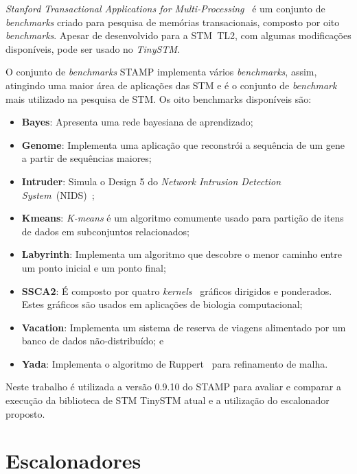 \documentclass[diss,capa]{texufpel}
\begin{document}
\emph{Stanford Transactional Applications for Multi-Processing}~\cite{STAMP} é um conjunto de \emph{benchmarks} criado para pesquisa de memórias transacionais, composto por oito \emph{benchmarks}. Apesar de desenvolvido para a STM~TL2, com algumas modificações disponíveis, pode ser usado no \emph{TinySTM}.


O conjunto de \emph{benchmarks} STAMP implementa vários \emph{benchmarks}, assim, atingindo uma maior área de aplicações das STM e é o conjunto de \emph{benchmark} mais utilizado na pesquisa de STM. Os oito benchmarks disponíveis são:

\begin{itemize}
  \item \textbf{Bayes}: Apresenta uma rede bayesiana de aprendizado;
  \item \textbf{Genome}: Implementa uma aplicação que reconstrói a sequência de um gene a partir de sequências maiores;
  \item \textbf{Intruder}: Simula o Design 5 do \emph{Network Intrusion Detection System}~(NIDS)~\cite{Haagdorens05};
  \item \textbf{Kmeans}:  \emph{K-means} é um algoritmo comumente usado para partição de itens de dados em subconjuntos relacionados;
  \item \textbf{Labyrinth}: Implementa um algoritmo que descobre o menor caminho entre um ponto inicial e um ponto final;
  \item \textbf{SSCA2}: É composto por quatro \emph{kernels}~\cite{Bader05} gráficos dirigidos e ponderados. Estes gráficos são usados em aplicações de biologia computacional;
  \item \textbf{Vacation}: Implementa um sistema de reserva de viagens alimentado por um banco de dados não-distribuído; e
  \item \textbf{Yada}: Implementa o algoritmo de Ruppert~\cite{Ruppert95} para refinamento de malha.
\end{itemize}

Neste trabalho é utilizada a versão 0.9.10 do STAMP para avaliar e comparar a execução da biblioteca de STM TinySTM atual e a utilização do escalonador proposto.

\chapter{Escalonadores}
\label{chapter::escalonadores}
\end{document}
